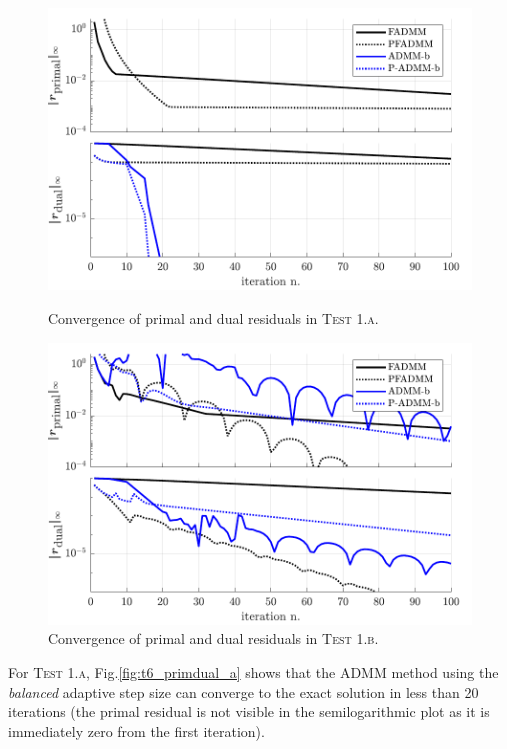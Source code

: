 \documentclass[AMA,STIX1COL]{WileyNJD-v2}
\begin{document}
\begin{figure}[!tbp]
  \centering
  \begin{minipage}[t]{0.48\textwidth}
    \includegraphics[width=\textwidth]{pics/t6_primdual_a.pdf}
    \caption{Convergence of primal and dual residuals in \textsc{Test 1.a}.}
		\label{fig:t6_primdual_a}
  \end{minipage}
  \hfill
  \begin{minipage}[t]{0.48\textwidth}
    \includegraphics[width=\textwidth]{pics/t6_primdual_b.pdf}
    \caption{Convergence of primal and dual residuals in \textsc{Test 1.b}. }
		\label{fig:t6_primdual_b}
  \end{minipage}
\end{figure}

For \textsc{Test 1.a}, Fig.\ref{fig:t6_primdual_a} shows that the ADMM method using the \textit{balanced} adaptive step size can converge to the exact solution in less than 20 iterations (the primal residual is not visible in the semilogarithmic plot as it is immediately zero from the first iteration). 
\end{document}
